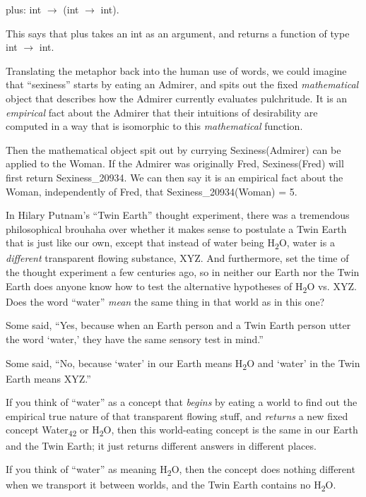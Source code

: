 {\centering
 plus: int $\rightarrow $ (int $\rightarrow $ int).
\par}


\bigskip

{
 This says that plus takes an int as an argument, and returns a
function of type int $\rightarrow $ int.}

{
 Translating the metaphor back into the human use of words, we
could imagine that ``sexiness''
starts by eating an Admirer, and spits out the fixed
\textit{mathematical} object that describes how the Admirer currently
evaluates pulchritude. It is an \textit{empirical} fact about the
Admirer that their intuitions of desirability are computed in a way
that is isomorphic to this \textit{mathematical} function.}

{
 Then the mathematical object spit out by currying
Sexiness(Admirer) can be applied to the Woman. If the Admirer was
originally Fred, Sexiness(Fred) will first return Sexiness\_20934. We
can then say it is an empirical fact about the Woman, independently of
Fred, that Sexiness\_20934(Woman) = 5.}

{
 In Hilary Putnam's ``Twin
Earth'' thought experiment, there was a tremendous
philosophical brouhaha over whether it makes sense to postulate a Twin
Earth that is just like our own, except that instead of water being
H\textsubscript{2}O, water is a \textit{different} transparent flowing
substance, XYZ. And furthermore, set the time of the thought experiment
a few centuries ago, so in neither our Earth nor the Twin Earth does
anyone know how to test the alternative hypotheses of
H\textsubscript{2}O vs. XYZ. Does the word
``water'' \textit{mean} the same
thing in that world as in this one?}

{
 Some said, ``Yes, because when an Earth person
and a Twin Earth person utter the word
`water,' they have the same sensory test
in mind.''}

{
 Some said, ``No, because
`water' in our Earth means
H\textsubscript{2}O and `water' in the
Twin Earth means XYZ.''}

{
 If you think of ``water'' as a
concept that \textit{begins} by eating a world to find out the
empirical true nature of that transparent flowing stuff, and
\textit{returns} a new fixed concept Water\textsubscript{42} or
H\textsubscript{2}O, then this world-eating concept is the same in our
Earth and the Twin Earth; it just returns different answers in
different places.}

{
 If you think of ``water'' as
meaning H\textsubscript{2}O, then the concept does nothing different
when we transport it between worlds, and the Twin Earth contains no
H\textsubscript{2}O.}

